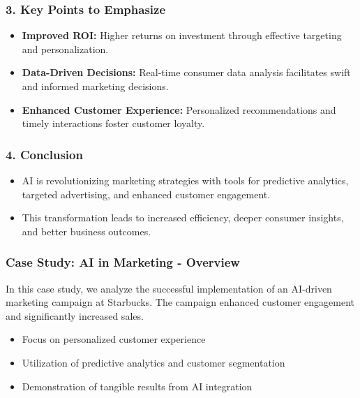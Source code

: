 \documentclass{beamer}
\begin{document}
\begin{frame}[fragile]
    \frametitle{3. Key Points to Emphasize}
    
    \begin{itemize}
        \item \textbf{Improved ROI:} Higher returns on investment through effective targeting and personalization.
        \item \textbf{Data-Driven Decisions:} Real-time consumer data analysis facilitates swift and informed marketing decisions.
        \item \textbf{Enhanced Customer Experience:} Personalized recommendations and timely interactions foster customer loyalty.
    \end{itemize}
\end{frame}

\begin{frame}[fragile]
    \frametitle{4. Conclusion}
    
    \begin{itemize}
        \item AI is revolutionizing marketing strategies with tools for predictive analytics, targeted advertising, and enhanced customer engagement.
        \item This transformation leads to increased efficiency, deeper consumer insights, and better business outcomes.
    \end{itemize}
\end{frame}

\begin{frame}[fragile]
    \frametitle{Case Study: AI in Marketing - Overview}
    In this case study, we analyze the successful implementation of an AI-driven marketing campaign at Starbucks. 
    The campaign enhanced customer engagement and significantly increased sales.
    
    \begin{itemize}
        \item Focus on personalized customer experience
        \item Utilization of predictive analytics and customer segmentation
        \item Demonstration of tangible results from AI integration
    \end{itemize}
\end{frame}
\end{document}
